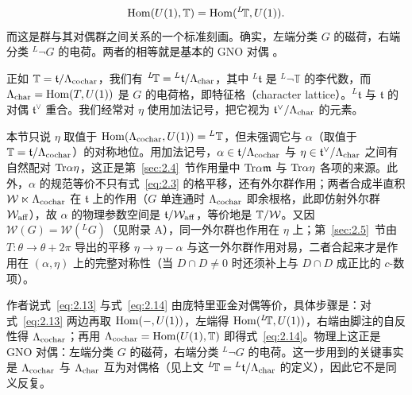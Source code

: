 \setcounter{equation}{13}
\begin{equation}\label{eq:2.14}
  {\rm Hom}(U(1),{\mathbb{T}})={\rm
Hom}(^L\negthinspace {\mathbb{T}},U(1)).
\end{equation}
 而这是群与其对偶群之间关系的一个标准刻画。确实，左端分类 $G$ 的磁荷，右端分类 $^L\neg G$ 的电荷。两者的相等就是基本的 GNO 对偶 \cite{ref39}。

正如 ${\mathbb{T}}={\mathfrak t}/\Lambda_{\rm cochar}$，我们有 $^L\negthinspace
{\mathbb{T}}={}^L{\mathfrak t}/\Lambda_{\rm char}$，其中 ${}^L\mathfrak t$ 是 ${}^L\neg \mathbb{T}$ 的李代数，而 $\Lambda_{\rm char}={\rm
Hom}(T,U(1))$ 是 $G$ 的电荷格，即特征格（character lattice）。${}^L\mathfrak t$ 与 $\mathfrak t$ 的对偶 $\mathfrak t^\vee$ 重合。我们经常对 $\eta$ 使用加法记号，把它视为 ${\mathfrak t}^\vee/\Lambda_{\rm char}$ 的元素。
\begin{yizhu}[易错点]
本节只说 $\eta$ 取值于 ${\rm Hom}(\Lambda_{\rm cochar},U(1))={}^L{\mathbb{T}}$，但未强调它与 $\alpha$（取值于 ${\mathbb{T}}={\mathfrak t}/\Lambda_{\rm cochar}$）的对称地位。用加法记号，$\alpha\in{\mathfrak t}/\Lambda_{\rm cochar}$ 与 $\eta\in{\mathfrak t}^\vee/\Lambda_{\rm char}$ 之间有自然配对 ${\rm Tr}\alpha\eta$，这正是第~\ref{sec:2.4}~节作用量中 ${\rm Tr}\alpha{\mathfrak m}$ 与 ${\rm Tr}\alpha\eta$ 各项的来源。此外，$\alpha$ 的规范等价不只有式~\eqref{eq:2.3} 的格平移，还有外尔群作用；两者合成半直积 ${\mathcal W}\ltimes\Lambda_{\rm cochar}$ 在 $\mathfrak t$ 上的作用（$G$ 单连通时 $\Lambda_{\rm cochar}$ 即余根格，此即仿射外尔群 ${\mathcal W}_{\rm aff}$），故 $\alpha$ 的物理参数空间是 $\mathfrak t/{\mathcal W}_{\rm aff}$，等价地是 ${\mathbb{T}}/{\mathcal W}$。又因 ${\mathcal W}(G)={\mathcal W}({}^L G)$（见附录 A），同一外尔群也作用在 $\eta$ 上；第~\ref{sec:2.5}~节由 $T:\theta\to\theta+2\pi$ 导出的平移 $\eta\to\eta-\alpha$ 与这一外尔群作用对易，二者合起来才是作用在 $(\alpha,\eta)$ 上的完整对称性（当 $D\cap D\ne0$ 时还须补上与 $D\cap D$ 成正比的 $c$-数项）。
\end{yizhu}

\begin{yizhu}[含糊点拨]
作者说式~\eqref{eq:2.13} 与式~\eqref{eq:2.14} 由庞特里亚金对偶等价，具体步骤是：对式~\eqref{eq:2.13} 两边再取 ${\rm Hom}(-,U(1))$，左端得 ${\rm Hom}({}^L\negthinspace{\mathbb{T}},U(1))$，右端由脚注的自反性得 $\Lambda_{\rm cochar}$；再用 $\Lambda_{\rm cochar}={\rm Hom}(U(1),{\mathbb{T}})$ 即得式~\eqref{eq:2.14}。物理上这正是 GNO 对偶：左端分类 $G$ 的磁荷，右端分类 $^L\neg G$ 的电荷。这一步用到的关键事实是 $\Lambda_{\rm cochar}$ 与 $\Lambda_{\rm char}$ 互为对偶格（见上文 ${}^L\negthinspace{\mathbb{T}}={}^L{\mathfrak t}/\Lambda_{\rm char}$ 的定义），因此它不是同义反复。
\end{yizhu}
